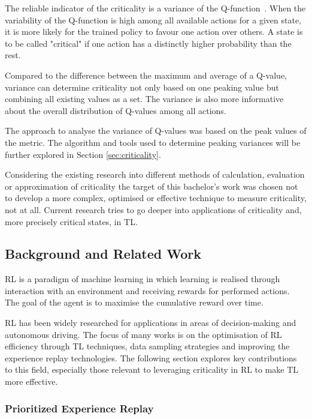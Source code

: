 The reliable indicator of the criticality is a variance of the Q-function~\cite{Spielberg_Azaria_2022}. When the variability of the Q-function is high among all available actions for a given state, it is more likely for the trained policy to favour one action over others. A state is to be called "critical" if one action has a distinctly higher probability than the rest.

Compared to the difference between the maximum and average of a Q-value, variance can determine criticality not only based on one peaking value but combining all existing values as a set. The variance is also more informative about the overall distribution of Q-values among all actions.

The approach to analyse the variance of Q-values was based on the peak values of the metric. The algorithm and tools used to determine peaking variances will be further explored in Section \ref{sec:criticality}.

Considering the existing research into different methods of calculation, evaluation or approximation of criticality the target of this bachelor's work was chosen not to develop a more complex, optimised or effective technique to measure criticality, not at all. Current research tries to go deeper into applications of criticality and, more precisely critical states, in TL. 

\subsection{Background and Related Work}\label{sec:subsubsec_2.3}

RL is a paradigm of machine learning in which learning is realised through interaction with an environment and receiving rewards for performed actions. The goal of the agent is to maximise the cumulative reward over time.

RL has been widely researched for applications in areas of decision-making and autonomous driving. The focus of many works is on the optimisation of RL efficiency through TL techniques, data sampling strategies and improving the experience replay technologies. The following section explores key contributions to this field, especially those relevant to leveraging criticality in RL to make TL more effective.

\subsubsection{Prioritized Experience Replay}\label{ssec:subsubsec_2.3.1}

